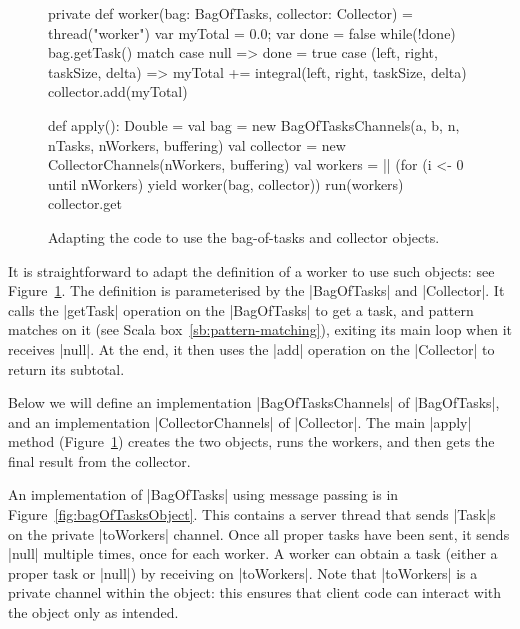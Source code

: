 
\begin{figure}
\begin{scala}
  private def worker(bag: BagOfTasks, collector: Collector) = thread("worker"){
    var myTotal = 0.0; var done = false
    while(!done) bag.getTask() match{
      case null => done = true
      case (left, right, taskSize, delta) =>
        myTotal += integral(left, right, taskSize, delta)
    }
    collector.add(myTotal)
  }

  def apply(): Double = {
    val bag = new BagOfTasksChannels(a, b, n, nTasks, nWorkers, buffering)
    val collector = new CollectorChannels(nWorkers, buffering)
    val workers = || (for (i <- 0 until nWorkers) yield worker(bag, collector))
    run(workers)
    collector.get
  }
\end{scala}
\caption{Adapting the code to use the bag-of-tasks and collector objects.}
\label{fig:BOT-using-objects}
\end{figure}

It is straightforward to adapt the definition of a worker to use such objects:
see Figure~\ref{fig:BOT-using-objects}.  The definition is parameterised by
the |BagOfTasks| and |Collector|.  It calls the |getTask| operation on the
|BagOfTasks| to get a task, and pattern matches on it (see Scala
box~\ref{sb:pattern-matching}), exiting its main loop when it receives |null|.
At the end, it then uses the |add| operation on the |Collector| to return its
subtotal.

Below we will define an implementation |BagOfTasksChannels| of |BagOfTasks|,
and an implementation |CollectorChannels| of |Collector|.  The main |apply|
method (Figure~\ref{fig:BOT-using-objects}) creates the two objects, runs the
workers, and then gets the final result from the collector.


An implementation of |BagOfTasks| using message passing is in
Figure~\ref{fig:bagOfTasksObject}.  This contains a server thread that sends
|Task|s on the private |toWorkers| channel.  Once all proper tasks have been
sent, it sends |null| multiple times, once for each worker.  A worker can
obtain a task (either a proper task or |null|) by receiving on |toWorkers|.
Note that |toWorkers| is a private channel within the object: this ensures
that client code can interact with the object only as intended.


